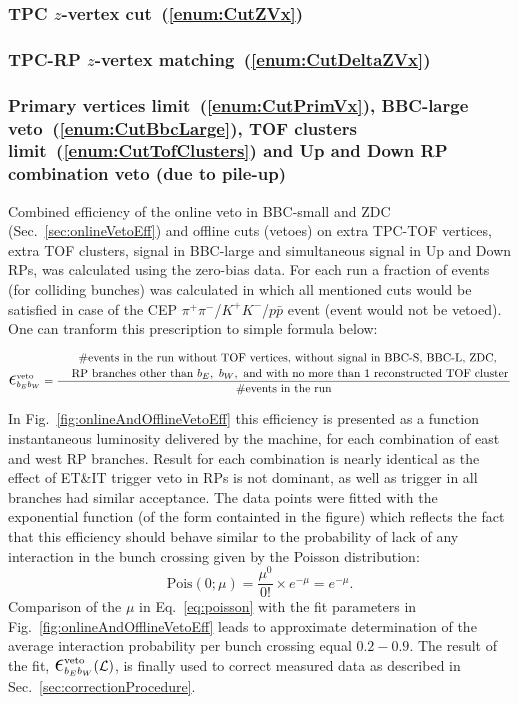 \subsubsection{TPC \texorpdfstring{$z$}{z}-vertex cut~(\ref{enum:CutZVx})}
\subsubsection{TPC-RP \texorpdfstring{$z$}{z}-vertex matching~(\ref{enum:CutDeltaZVx})}
\subsubsection{Primary vertices limit~(\ref{enum:CutPrimVx}), BBC-large veto~(\ref{enum:CutBbcLarge}), TOF clusters limit~(\ref{enum:CutTofClusters}) and Up and Down RP combination veto (due to pile-up)}\label{sec:onlineAndOfflineVetoEff}

Combined efficiency of the online veto in BBC-small and ZDC (Sec.~\ref{sec:onlineVetoEff}) and offline cuts (vetoes) on extra TPC-TOF vertices, extra TOF clusters, signal in BBC-large and simultaneous signal in Up and Down RPs, was calculated using the zero-bias data. For each run a fraction of events (for colliding bunches) was calculated in which all mentioned cuts would be satisfied in case of the CEP $\pi^{+}\pi^{-}$/$K^{+}K^{-}$/$p\bar{p}$ event (event would not be vetoed). One can tranform this prescription to simple formula below:

\begin{equation}
 \mbox{\LARGE$\epsilon$}^{\text{veto}}_{b_{E}b_{W}}=\dfrac{\splitdfrac{~~~~~\text{\#events in the run without TOF vertices, without signal in BBC-S, BBC-L, ZDC,}}{\text{RP branches other than} ~b_{E},~b_{W},~\text{and with no more than 1 reconstructed TOF cluster}}}{\text{\#events in the run}}
\end{equation}

In Fig.~\ref{fig:onlineAndOfflineVetoEff} this efficiency is presented as a function instantaneous luminosity delivered by the machine, for each combination of east and west RP branches. Result for each combination is nearly identical as the effect of ET\&IT trigger veto in RPs is not dominant, as well as trigger in all branches had similar acceptance. The data points were fitted with the exponential function (of the form containted in the figure) which reflects the fact that this efficiency should behave similar to the probability of lack of any interaction in the bunch crossing given by the Poisson distribution:
\begin{equation}\label{eq:poisson}
 \text{Pois}(0;\mu) = \frac{\mu^{0}}{0!} \times e^{-\mu} = e^{-\mu}.
\end{equation}
Comparison of the $\mu$ in Eq.~\eqref{eq:poisson} with the fit parameters in Fig.~\ref{fig:onlineAndOfflineVetoEff} leads to approximate determination of the average interaction probability per bunch crossing equal $0.2-0.9$. The result of the fit, $ \mbox{\LARGE$\epsilon$}^{\text{veto}}_{b_{E}b_{W}}(\mathcal{L})$, is finally used to correct measured data as described in Sec.~\ref{sec:correctionProcedure}. 

